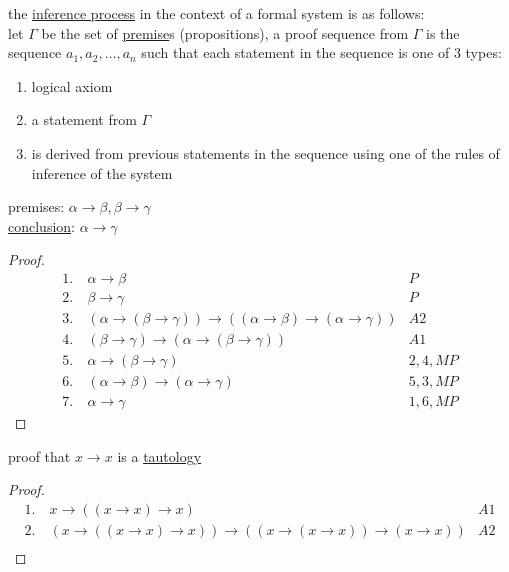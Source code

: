 \documentclass[a4paper,12pt]{article}
\begin{document}
\begin{definition}
the \href{20230525071323-formal_proof.org}{inference process} in the context of a formal system is as follows:\\[0pt]
let \(\Gamma\) be the set of \href{20230524212241-premise.org}{premise}s (propositions), a proof sequence from \(\Gamma\) is the sequence \(a_1,a_2,\dots,a_n\) such that each statement in the sequence is one of 3 types:\\[0pt]
\begin{enumerate}
\item logical axiom\\[0pt]
\item a statement from \(\Gamma\)\\[0pt]
\item is derived from previous statements in the sequence using one of the rules of inference of the system\\[0pt]
\end{enumerate}
\begin{my_example}
premises: \(\alpha \to \beta, \beta \to \gamma\)\\[0pt]
\href{20230524212250-conclusion.org}{conclusion}: \(\alpha \to \gamma\)\\[0pt]
\begin{proof}
\begin{align*}
  1.\ & \alpha \to \beta & P\\
  2.\ & \beta \to \gamma & P\\
  3.\ & (\alpha \to (\beta \to \gamma)) \to ((\alpha \to \beta) \to (\alpha \to \gamma)) & A2\\
  4.\ & (\beta \to \gamma) \to (\alpha \to (\beta \to \gamma)) & A1\\
  5.\ & \alpha \to (\beta \to \gamma) & 2,4,MP\\
  6.\ & (\alpha \to \beta) \to (\alpha \to \gamma) & 5,3,MP\\
  7.\ & \alpha \to \gamma & 1,6,MP
\end{align*}
\end{proof}
\end{my_example}
\begin{my_example}
proof that \(x \to x\) is a \href{20230525062442-tautology.org}{tautology}\\[0pt]
\begin{proof}
\begin{align*}
  1.\ & x \to ((x \to x) \to x) & A1\\
  2.\ & (x \to ((x \to x) \to x)) \to ((x \to (x \to x)) \to (x \to x)) & A2\\

\end{align*}
\end{proof}
\end{my_example}
\end{definition}
\end{document}
